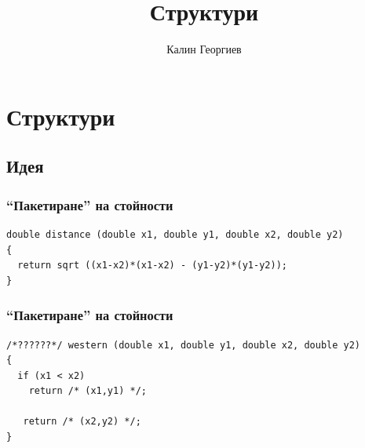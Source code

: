 \documentclass{beamer}
\begin{document}
\title[Увод в програмирането]{Структури}
\author{Калин Георгиев}
\frame{\titlepage}

\section{Структури}
\subsection{Идея}

\begin{frame}[fragile]
\frametitle{``Пакетиране'' на стойности}

\begin{lstlisting}
double distance (double x1, double y1, double x2, double y2)
{
  return sqrt ((x1-x2)*(x1-x2) - (y1-y2)*(y1-y2));
}

\end{lstlisting}
\end{frame}


\begin{frame}[fragile]
\frametitle{``Пакетиране'' на стойности}

\begin{lstlisting}
/*??????*/ western (double x1, double y1, double x2, double y2)
{
  if (x1 < x2)
    return /* (x1,y1) */;

   return /* (x2,y2) */;
}
\end{lstlisting}

\end{frame}
\end{document}
